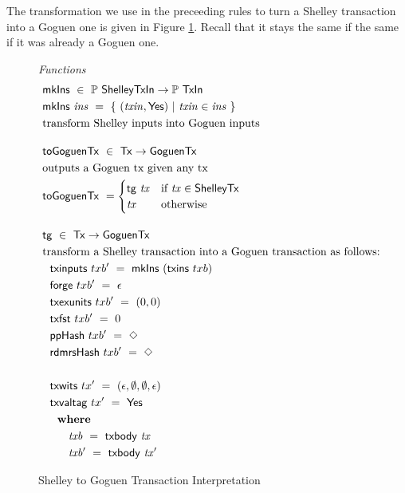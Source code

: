The transformation we use in the preceeding rules to turn a Shelley
transaction into a Goguen one is given in Figure
\ref{fig:functions:to-shelley}. Recall that it stays the same if the same
if it was already a Goguen one.

\begin{figure}[htb]
  \emph{Functions}
  \begin{align*}
      & \fun{mkIns} ~\in~ \powerset{\ShelleyTxIn} \to \powerset{\TxIn}  \\
      & \fun{mkIns}~\var{ins} ~=~ \{~ (\var{txin}, \Yes) ~\vert~
      \var{txin} \in \var{ins}~\} \\
      & \text{transform Shelley inputs into Goguen inputs}
      \nextdef
      & \fun{toGoguenTx} ~\in~  \Tx \to \GoguenTx \\
      & \text{outputs a Goguen tx given any tx} \\
      & \fun{toGoguenTx} ~=
          \begin{cases}
           \fun{tg}~\var{tx}  & \text{if~} \var{tx} \in \ShelleyTx \\
                \var{tx} & \text{otherwise}
              \end{cases}
      \nextdef
      & \fun{tg} ~\in~  \Tx \to \GoguenTx \\
      & \text{transform a Shelley transaction into a Goguen transaction as follows:} \\
      & ~~\fun{txinputs}~{txb'} ~=~ \fun{mkIns}~(\fun{txins}~{txb}) \\
      & ~~\fun{forge}~{txb'} ~= ~\epsilon \\
      & ~~\fun{txexunits}~{txb'} ~= ~(0,0) \\
      & ~~\fun{txfst}~{txb'} ~= ~0 \\
      & ~~\fun{ppHash}~{txb'} ~= ~\Nothing \\
      & ~~\fun{rdmrsHash}~{txb'} ~= ~\Nothing \\~\\
      & ~~\fun{txwits}~{tx'} ~= ~(\epsilon,\emptyset,\emptyset,\epsilon) \\
      & ~~\fun{txvaltag}~{tx'} ~= ~\Yes \\
      &~~      \where \\
      & ~~~~~~~ \var{txb}~=~\txbody{tx} \\
      & ~~~~~~~ \var{txb'}~=~\txbody{tx'}
  \end{align*}
  \caption{Shelley to Goguen Transaction Interpretation}
  \label{fig:functions:to-shelley}
\end{figure}
